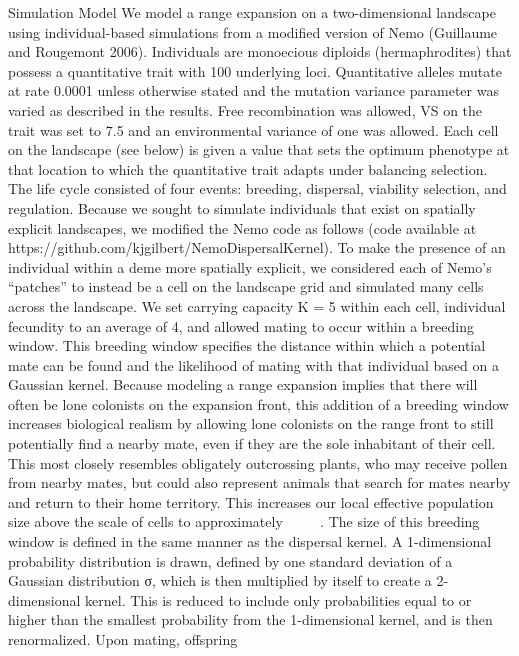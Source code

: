 Simulation Model
We model a range expansion on a two-dimensional landscape using individual-based simulations 
from a modified version of Nemo (Guillaume and Rougemont 2006). Individuals are monoecious 
diploids (hermaphrodites) that possess a quantitative trait with 100 underlying loci. 
Quantitative alleles mutate at rate 0.0001 unless otherwise stated and the mutation variance 
parameter was varied as described in the results. Free recombination was allowed, VS on the 
trait was set to 7.5 and an environmental variance of one was allowed. Each cell on the 
landscape (see below) is given a value that sets the optimum phenotype at that location 
to which the quantitative trait adapts under balancing selection.
The life cycle consisted of four events: breeding, dispersal, viability selection, and regulation. 
Because we sought to simulate individuals that exist on spatially explicit landscapes, we modified 
the Nemo code as follows (code available at https://github.com/kjgilbert/NemoDispersalKernel). 
To make the presence of an individual within a deme more spatially explicit, we considered each 
of Nemo’s “patches” to instead be a cell on the landscape grid and simulated many cells across 
the landscape. We set carrying capacity K = 5 within each cell, individual fecundity to an 
average of 4, and allowed mating to occur within a breeding window. This breeding window 
specifies the distance within which a potential mate can be found and the likelihood of 
mating with that individual based on a Gaussian kernel. Because modeling a range expansion 
implies that there will often be lone colonists on the expansion front, this addition of a 
breeding window increases biological realism by allowing lone colonists on the range front 
to still potentially find a nearby mate, even if they are the sole inhabitant of their cell. 
This most closely resembles obligately outcrossing plants, who may receive pollen from nearby 
mates, but could also represent animals that search for mates nearby and return to their home 
territory. This increases our local effective population size above the scale of cells to 
approximately    ~~~~ . The size of this breeding window is defined in the same manner as the 
dispersal kernel. A 1-dimensional probability distribution is drawn, defined by one standard 
deviation of a Gaussian distribution σ, which is then multiplied by itself to create a 2-dimensional 
kernel. This is reduced to include only probabilities equal to or higher than the smallest 
probability from the 1-dimensional kernel, and is then renormalized. Upon mating, offspring 
